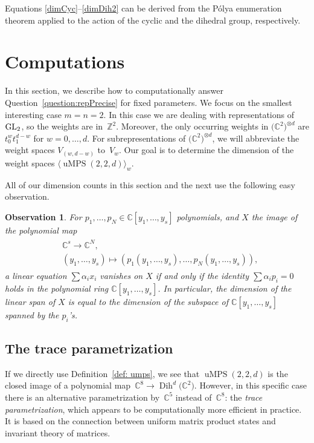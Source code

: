 \documentclass[pdftex]{sigma}
\numberwithin{equation}{section}
\newtheorem{observation}[Theorem]{Observation}
\newcommand{\ZZ}{\mathbb{Z}}
\newcommand{\CC}{\mathbb{C}}
\newcommand{\ot}{\otimes}
\DeclareMathOperator{\uMPS}{uMPS}
\DeclareMathOperator{\Dih}{Dih}
\begin{document}
Equations \eqref{dimCyc}--\eqref{dimDih2} can be derived from the P\'olya enumeration theorem \cite{polya2012combinatorial} applied to the action of the
 cyclic and the dihedral group, respectively.

  \section{Computations} \label{sec:comp}

 In this section, we describe how to computationally answer Question~\ref{question:repPrecise} for fixed parameters. We focus on the smallest interesting case $m=n=2$.
 In this case we are dealing with representations of ${\rm GL}_2$, so the weights are in~$\ZZ^2$. Moreover, the only occurring weights in $\big(\CC^2\big)^{\ot d}$ are $t_0^{w}t_1^{d-w}$ for $w=0,\dots,d$. For subrepresentations of $\big(\CC^2\big)^{\ot d}$, we will abbreviate the weight spaces $V_{(w,d-w)}$ to~$V_w$. Our goal is to determine the dimension of the weight spaces $\langle \uMPS(2,2,d) \rangle_w$.

 All of our dimension counts in this section and the next use the following easy observation.
 \begin{observation} \label{obs:dimLinSpan}
       For $p_1, \dots, p_N \in \CC[y_1,\dots,y_s]$ polynomials, and $X$ the image of the polynomial map
 \begin{gather} \label{eq:imageOfAPolynomialMap}
 \begin{split}
     & \CC^s\to \CC^N ,\\
    &  (y_1, \dots, y_s) \mapsto (p_1(y_1,\dots, y_s), \dots, p_N(y_1,\dots, y_s)),
      \end{split}
 \end{gather}
 a linear equation $\sum{\alpha_ix_i}$ vanishes on $X$ if and only if the identity $\sum{\alpha_ip_i} = 0$ holds in the polynomial ring $\CC[y_1,\dots,y_s]$. In particular, the dimension of the linear span of $X$ is equal to the dimension of the subspace of $\CC[y_1,\dots,y_s]$ spanned by the $p_i$'s.
 \end{observation}

 \subsection{The trace parametrization} If we directly use Definition~\ref{def: umps}, we see that $\uMPS(2,2,d)$ is the closed image of a polynomial map~$\CC^8 \to \Dih^d\big(\CC^2\big)$. However, in this specific case there is an alternative parametrization by~$\CC^5$ instead of~$\CC^8$: the \emph{trace parametrization}, which appears to be computationally more efficient in practice. It is based on the connection between uniform matrix product states and invariant theory of matrices.
\end{document}
